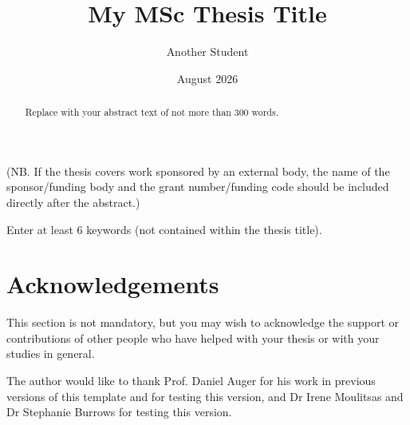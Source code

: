 \documentclass[12pt,oneside]{book} %
\title{My MSc Thesis Title}
\author{Another Student}
\date{August 2026}
\begin{document}
%
%

\frontmatter

\maketitle

\begin{abstract}
Replace with your abstract text of not more than 300 words.
\end{abstract}

(NB. If the thesis covers work sponsored by an external body, the name of the sponsor/funding body and the grant number/funding code should be included directly after the abstract.)

\begin{keywords}
Enter at least 6 keywords (not contained within the thesis title).
\end{keywords}

\chapter{Acknowledgements}
This section is not mandatory, but you may wish to acknowledge the support or contributions of other people who have helped with your thesis or with your studies in general.

The author would like to thank Prof. Daniel Auger for his work in previous versions of this template and for testing this version, and Dr Irene Moulitsas and Dr Stephanie Burrows for testing this version.

{
\clearpage
\singlespacing
{
\tableofcontents
}
\clearpage

\listoffigures

\clearpage
\listoftables
}

\begin{listofabbreviations}
\end{listofabbreviations}
\end{document}
